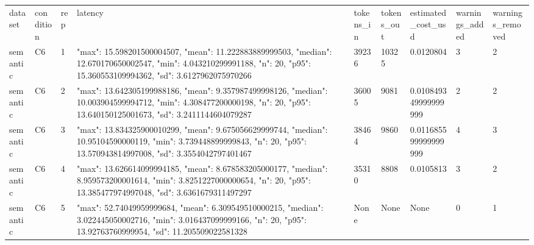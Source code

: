 \begin{tabular}{lllllllll}
dataset & condition & rep & latency & tokens\_in & tokens\_out & estimated\_cost\_usd & warnings\_added & warnings\_removed \\
semantic & C6 & 1 & {"max": 15.598201500004507, "mean": 11.222883889999503, "median": 12.670170650002547, "min": 4.043210299991188, "n": 20, "p95": 15.360553109994362, "sd": 3.6127962075970266} & 39236 & 10325 & 0.0120804 & 3 & 2 \\
semantic & C6 & 2 & {"max": 13.642305199988186, "mean": 9.357987499998126, "median": 10.003904599994712, "min": 4.308477200000198, "n": 20, "p95": 13.640150125001673, "sd": 3.2411144604079287} & 36005 & 9081 & 0.010849349999999999 & 2 & 2 \\
semantic & C6 & 3 & {"max": 13.834325900010299, "mean": 9.675056629999744, "median": 10.95104590000119, "min": 3.739448899999843, "n": 20, "p95": 13.570943814997008, "sd": 3.3554042797401467} & 38464 & 9860 & 0.011685599999999999 & 4 & 3 \\
semantic & C6 & 4 & {"max": 13.626614099994185, "mean": 8.678583205000177, "median": 8.959573200001614, "min": 3.8251227000000654, "n": 20, "p95": 13.385477974997048, "sd": 3.6361679311497297} & 35310 & 8808 & 0.0105813 & 3 & 2 \\
semantic & C6 & 5 & {"max": 52.74049959999684, "mean": 6.309549510000215, "median": 3.022445050002716, "min": 3.016437099999166, "n": 20, "p95": 13.92763760999954, "sd": 11.205509022581328} & None & None & None & 0 & 1 \\
\end{tabular}